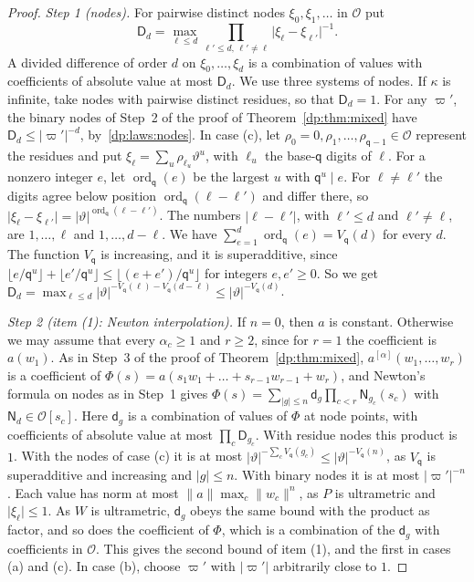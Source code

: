 \documentclass[11pt]{amsart}
\theoremstyle{definition}
\theoremstyle{remark}
\numberwithin{equation}{section}
\newcommand{\abs}[1]{\lvert #1\rvert}
\newcommand{\norm}[1]{\lVert #1\rVert}
\newcommand{\ord}{\operatorname{ord}}
\theoremstyle{plain}
\theoremstyle{definition}
\theoremstyle{plain}
\begin{document}
\begin{proof}
\emph{Step 1 (nodes).} For pairwise distinct nodes $\xi_0,\xi_1,\dots$ in $\mathcal O$ put
\[
 \mathsf D_d=\max_{\ell\le d}\prod_{\ell'\le d,\,\ell'\ne\ell}\abs{\xi_\ell-\xi_{\ell'}}^{-1}.
\]
A divided difference of order $d$ on $\xi_0,\dots,\xi_d$ is a combination of values with coefficients of absolute value at most $\mathsf D_d$. We use three systems of nodes. If $\kappa$ is infinite, take nodes with pairwise distinct residues, so that $\mathsf D_d=1$. For any $\varpi'$, the binary nodes of Step~2 of the proof of Theorem~\ref{dp:thm:mixed} have $\mathsf D_d\le\abs{\varpi'}^{-d}$, by~\eqref{dp:laws:nodes}. In case (c), let $\rho_0=0,\rho_1,\dots,\rho_{\mathsf q-1}\in\mathcal O$ represent the residues and put $\xi_\ell=\sum_u\rho_{\ell_u}\vartheta^u$, with $\ell_u$ the base-$\mathsf q$ digits of $\ell$. For a nonzero integer $e$, let $\ord_{\mathsf q}(e)$ be the largest $u$ with $\mathsf q^u\mid e$. For $\ell\ne\ell'$ the digits agree below position $\ord_{\mathsf q}(\ell-\ell')$ and differ there, so $\abs{\xi_\ell-\xi_{\ell'}}=\abs\vartheta^{\ord_{\mathsf q}(\ell-\ell')}$. The numbers $\abs{\ell-\ell'}$, with $\ell'\le d$ and $\ell'\ne\ell$, are $1,\dots,\ell$ and $1,\dots,d-\ell$. We have $\sum_{e=1}^d\ord_{\mathsf q}(e)=V_{\mathsf q}(d)$ for every $d$. The function $V_{\mathsf q}$ is increasing, and it is superadditive, since $\lfloor e/\mathsf q^u\rfloor+\lfloor e'/\mathsf q^u\rfloor\le\lfloor(e+e')/\mathsf q^u\rfloor$ for integers $e,e'\ge0$. So we get $\mathsf D_d=\max_{\ell\le d}\abs\vartheta^{-V_{\mathsf q}(\ell)-V_{\mathsf q}(d-\ell)}\le\abs\vartheta^{-V_{\mathsf q}(d)}$.

\emph{Step 2 (item (1): Newton interpolation).} If $n=0$, then $a$ is constant. Otherwise we may assume that every $\alpha_c\ge1$ and $r\ge2$, since for $r=1$ the coefficient is $a(w_1)$. As in Step~3 of the proof of Theorem~\ref{dp:thm:mixed}, $a^{[\alpha]}(w_1,\dots,w_r)$ is a coefficient of $\Phi(s)=a(s_1w_1+\dots+s_{r-1}w_{r-1}+w_r)$, and Newton's formula on nodes as in Step~1 gives $\Phi(s)=\sum_{\abs g\le n}\mathsf d_g\prod_{c<r}\mathsf N_{g_c}(s_c)$ with $\mathsf N_d\in\mathcal O[s_c]$. Here $\mathsf d_g$ is a combination of values of $\Phi$ at node points, with coefficients of absolute value at most $\prod_c\mathsf D_{g_c}$. With residue nodes this product is $1$. With the nodes of case (c) it is at most $\abs\vartheta^{-\sum_cV_{\mathsf q}(g_c)}\le\abs\vartheta^{-V_{\mathsf q}(n)}$, as $V_{\mathsf q}$ is superadditive and increasing and $\abs g\le n$. With binary nodes it is at most $\abs{\varpi'}^{-n}$. Each value has norm at most $\norm a\max_c\norm{w_c}^n$, as $P$ is ultrametric and $\abs{\xi_\ell}\le1$. As $W$ is ultrametric, $\mathsf d_g$ obeys the same bound with the product as factor, and so does the coefficient of $\Phi$, which is a combination of the $\mathsf d_g$ with coefficients in $\mathcal O$. This gives the second bound of item (1), and the first in cases (a) and (c). In case (b), choose $\varpi'$ with $\abs{\varpi'}$ arbitrarily close to $1$.


\end{proof}
\end{document}
